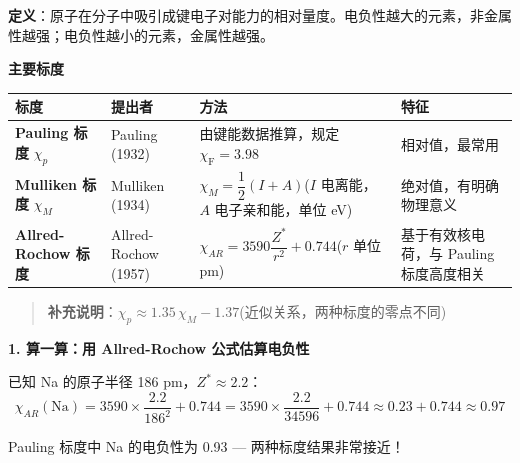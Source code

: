 \textbf{定义}：原子在分子中吸引成键电子对能力的相对量度。电负性越大的元素，非金属性越强；电负性越小的元素，金属性越强。

\textbf{主要标度}

{\def\LTcaptype{none} %
\begin{longtable}[]{@{}
  >{\raggedright\arraybackslash}p{}
  >{\raggedright\arraybackslash}p{}
  >{\raggedright\arraybackslash}p{}
  >{\raggedright\arraybackslash}p{}@{}}
\toprule\noalign{}
\begin{minipage}[b]{\linewidth}\raggedright
标度
\end{minipage} & \begin{minipage}[b]{\linewidth}\raggedright
提出者
\end{minipage} & \begin{minipage}[b]{\linewidth}\raggedright
方法
\end{minipage} & \begin{minipage}[b]{\linewidth}\raggedright
特征
\end{minipage} \\
\midrule\noalign{}
\endhead
\bottomrule\noalign{}
\endlastfoot
\textbf{Pauling 标度} \(\chi_p\) & Pauling (1932) & 由键能数据推算，规定 \(\chi_{\mathrm{F}}=3.98\) & 相对值，最常用 \\
\textbf{Mulliken 标度} \(\chi_M\) & Mulliken (1934) & \(\chi_M = \dfrac{1}{2}(I + A)\)(\(I\) 电离能，\(A\) 电子亲和能，单位 eV) & 绝对值，有明确物理意义 \\
\textbf{Allred-Rochow 标度} & Allred-Rochow (1957) & \(\chi_{AR} = 3590\dfrac{Z^*}{r^2} + 0.744\)(\(r\) 单位 pm) & 基于有效核电荷，与 Pauling 标度高度相关 \\
\end{longtable}
}

\begin{quote}
\textbf{补充说明}：\(\chi_p \approx 1.35\,\chi_M - 1.37\)(近似关系，两种标度的零点不同)
\end{quote}

\textbf{1. 算一算：用 Allred-Rochow 公式估算电负性}

已知 Na 的原子半径 186 pm，\(Z^* \approx 2.2\)：
\[\chi_{AR}(\mathrm{Na}) = 3590 \times \frac{2.2}{186^2} + 0.744 = 3590 \times \frac{2.2}{34596} + 0.744 \approx 0.23 + 0.744 \approx 0.97\]

Pauling 标度中 Na 的电负性为 0.93 --- 两种标度结果非常接近！

